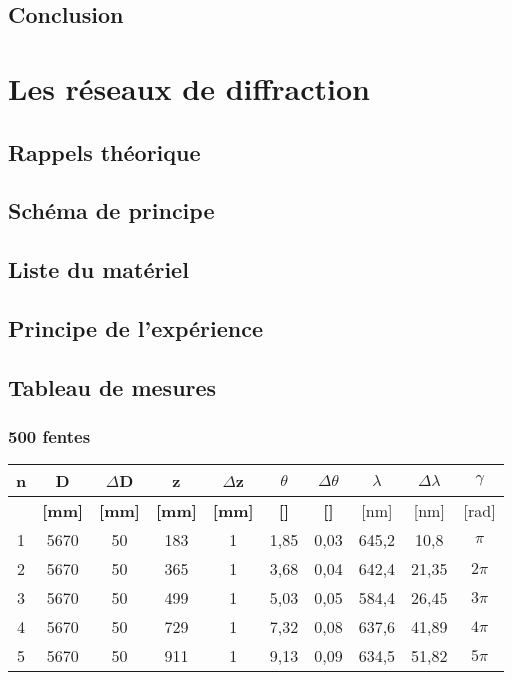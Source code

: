 \documentclass[11pt,a4paper]{report}
\begin{document}
	\section{Conclusion}
\chapter{Les réseaux de diffraction}
	\section{Rappels théorique}
	\section{Schéma de principe}
	\section{Liste du matériel}
	\section{Principe de l'expérience}
	\section{Tableau de mesures}
	\subsection{500 fentes}
	\begin{tabular}{|c|c|c|c|c|c|c|c|c|c|}
		\hline
		\bf n & \bf D & \bf $\Delta$D & \bf z & \bf $\Delta$z & \bf $\theta$ & \bf $\Delta \theta$ & $\lambda$& $\Delta \lambda$&\bf $\gamma$ \\
		\hline
		 & \bf [mm] & \bf [mm] & \bf [mm] & \bf [mm] & \bf [\degre]  & \bf [\degre]  &  [nm] & [nm] & [rad]\\
		\hline
		1 & 5670 & 50 & 183 &   1&1,85&0,03&645,2&10,8 &$\pi$\\
		2 & 5670 & 50 & 365 &  1&3,68&0,04&642,4&21,35&$2\pi$\\
		3 & 5670 & 50 & 499 &  1&5,03&0,05&584,4&26,45&$3\pi$\\
		4 & 5670 & 50 & 729 &  1&7,32&0,08&637,6&41,89&$4\pi$\\
		5 & 5670 & 50 & 911 &  1&9,13&0,09&634,5&51,82&$5\pi$\\
		\hline
	\end{tabular}
\end{document}
